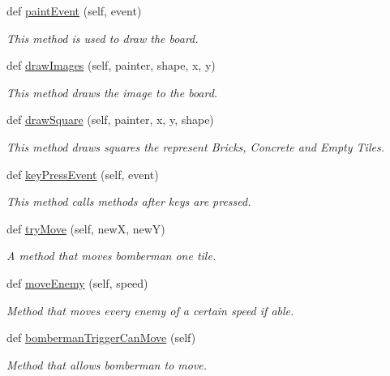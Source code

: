 \begin{DoxyCompactItemize}
\item 
def \hyperlink{classsrc_1_1board_1_1_board_aea8bc4036301719acbca3f62aa98e125}{paint\+Event} (self, event)
\begin{DoxyCompactList}\small\item\em This method is used to draw the board. \end{DoxyCompactList}\item 
def \hyperlink{classsrc_1_1board_1_1_board_ac85b9f4f5c9a91b200fb7e9e75d69d29}{draw\+Images} (self, painter, shape, x, y)
\begin{DoxyCompactList}\small\item\em This method draws the image to the board. \end{DoxyCompactList}\item 
def \hyperlink{classsrc_1_1board_1_1_board_a5e6978f5baf0f94e864867df77d5c891}{draw\+Square} (self, painter, x, y, shape)
\begin{DoxyCompactList}\small\item\em This method draws squares the represent Bricks, Concrete and Empty Tiles. \end{DoxyCompactList}\item 
def \hyperlink{classsrc_1_1board_1_1_board_a656fb42b7e9a4e4b5aae20c261170fe3}{key\+Press\+Event} (self, event)
\begin{DoxyCompactList}\small\item\em This method calls methods after keys are pressed. \end{DoxyCompactList}\item 
def \hyperlink{classsrc_1_1board_1_1_board_a663a599889dead3d876c4e4d79123b8e}{try\+Move} (self, new\+X, new\+Y)
\begin{DoxyCompactList}\small\item\em A method that moves bomberman one tile. \end{DoxyCompactList}\item 
def \hyperlink{classsrc_1_1board_1_1_board_abcf6e3affb8c4b83c6d0ab28e265b4d5}{move\+Enemy} (self, speed)
\begin{DoxyCompactList}\small\item\em Method that moves every enemy of a certain speed if able. \end{DoxyCompactList}\item 
def \hyperlink{classsrc_1_1board_1_1_board_a60ef4247af25957bcaaa0469eb222ac1}{bomberman\+Trigger\+Can\+Move} (self)
\begin{DoxyCompactList}\small\item\em Method that allows bomberman to move. \end{DoxyCompactList}\item 

\end{DoxyCompactItemize}
